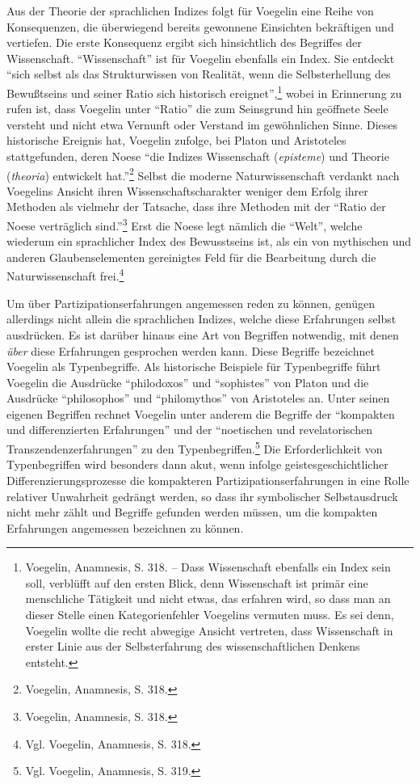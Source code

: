 Aus der Theorie der sprachlichen Indizes folgt für Voegelin eine Reihe von
Konsequenzen, die überwiegend bereits gewonnene Einsichten bekräftigen und
vertiefen. Die erste Konsequenz ergibt sich hinsichtlich des Begriffes der
Wissenschaft. "`Wissenschaft"' ist für Voegelin ebenfalls ein Index. Sie
entdeckt "`sich selbst als das Strukturwissen von Realität, wenn die
Selbsterhellung des Bewußtseins und seiner Ratio sich historisch
ereignet"',\footnote{Voegelin, Anamnesis, S. 318. -- Dass Wissenschaft
  ebenfalls ein Index sein soll, verblüfft auf den ersten Blick, denn
  Wissenschaft ist primär eine menschliche Tätigkeit und nicht etwas, das
  erfahren wird, so dass man an dieser Stelle einen Kategorienfehler
  Voegelins vermuten muss. Es sei denn, Voegelin wollte die recht abwegige
  Ansicht vertreten, dass Wissenschaft in erster Linie aus der Selbsterfahrung
  des wissenschaftlichen Denkens entsteht.} wobei in Erinnerung zu rufen ist,
dass Voegelin unter "`Ratio"' die zum Seinsgrund hin geöffnete Seele versteht
und nicht etwa Vernunft oder Verstand im gewöhnlichen Sinne. Dieses
historische Ereignis hat, Voegelin zufolge, bei Platon und Aristoteles
stattgefunden, deren Noese "`die Indizes Wissenschaft ({\it episteme}) und
Theorie ({\it theoria}) entwickelt hat."'\footnote{Voegelin, Anamnesis,
  S. 318.} Selbst die moderne Naturwissenschaft verdankt nach Voegelins Ansicht
ihren Wissenschaftscharakter weniger dem Erfolg ihrer Methoden als vielmehr
der Tatsache, dass ihre Methoden mit der "`Ratio der Noese verträglich
sind."'\footnote{Voegelin, Anamnesis, S. 318.} Erst die Noese legt nämlich die
"`Welt"', welche wiederum ein sprachlicher Index des Bewusstseins ist, als ein
von mythischen und anderen Glaubenselementen gereinigtes Feld für die
Bearbeitung durch die Naturwissenschaft frei.\footnote{Vgl. Voegelin,
  Anamnesis, S. 318.}

Um über Partizipationserfahrungen angemessen reden zu können, genügen
allerdings nicht allein die sprachlichen Indizes, welche diese Erfahrungen
selbst ausdrücken. Es ist darüber hinaus eine Art von Begriffen notwendig, mit
denen {\it über} diese Erfahrungen gesprochen werden kann. Diese Begriffe
bezeichnet Voegelin als Typenbegriffe. Als historische Beispiele für
Typenbegriffe führt Voegelin die Ausdrücke "`philodoxos"' und "`sophistes"'
von Platon und die Ausdrücke "`philosophos"' und "`philomythos"' von
Aristoteles an. Unter seinen eigenen Begriffen rechnet Voegelin unter anderem
die Begriffe der "`kompakten und differenzierten Erfahrungen"' und der
"`noetischen und revelatorischen Transzendenzerfahrungen"' zu den
Typenbegriffen.\footnote{Vgl. Voegelin, Anamnesis, S. 319.} Die
Erforderlichkeit von Typenbegriffen wird besonders dann akut, wenn infolge
geistesgeschichtlicher Differenzierungsprozesse die kompakteren
Partizipationserfahrungen in eine Rolle relativer Unwahrheit gedrängt werden,
so dass ihr symbolischer Selbstausdruck nicht mehr zählt und Begriffe gefunden
werden müssen, um die kompakten Erfahrungen angemessen bezeichnen zu können.

